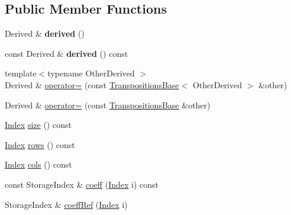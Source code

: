 \subsection*{Public Member Functions}
\begin{DoxyCompactItemize}
\item 
\mbox{\label{class_eigen_1_1_transpositions_base_a108277feb5d561ccd82a92b54d551131}} 
Derived \& {\bfseries derived} ()
\item 
\mbox{\label{class_eigen_1_1_transpositions_base_a170ba41d65a332d9e61f891ec6206ad9}} 
const Derived \& {\bfseries derived} () const
\item 
{\footnotesize template$<$typename Other\+Derived $>$ }\\Derived \& \mbox{\hyperlink{class_eigen_1_1_transpositions_base_a476b5c653c6842e3e4d0104f7f888817}{operator=}} (const \mbox{\hyperlink{class_eigen_1_1_transpositions_base}{Transpositions\+Base}}$<$ Other\+Derived $>$ \&other)
\item 
Derived \& \mbox{\hyperlink{class_eigen_1_1_transpositions_base_a8d12862df7ffdb0f2cfd81ab122847ca}{operator=}} (const \mbox{\hyperlink{class_eigen_1_1_transpositions_base}{Transpositions\+Base}} \&other)
\item 
\mbox{\hyperlink{class_eigen_1_1_transpositions_base_a3f5f06118b419e8e6ccbe49ed5b4c91f}{Index}} \mbox{\hyperlink{class_eigen_1_1_transpositions_base_a6888d6261a9cc24ee8607496e610a5a3}{size}} () const
\item 
\mbox{\hyperlink{class_eigen_1_1_transpositions_base_a3f5f06118b419e8e6ccbe49ed5b4c91f}{Index}} \mbox{\hyperlink{class_eigen_1_1_transpositions_base_a8c073f17542a8fc9ac581c17f6cdc8d3}{rows}} () const
\item 
\mbox{\hyperlink{class_eigen_1_1_transpositions_base_a3f5f06118b419e8e6ccbe49ed5b4c91f}{Index}} \mbox{\hyperlink{class_eigen_1_1_transpositions_base_acb6f58081640839bd4102b75bdeec562}{cols}} () const
\item 
const Storage\+Index \& \mbox{\hyperlink{class_eigen_1_1_transpositions_base_aae1d3847b107e518c9f2b6010a6b635a}{coeff}} (\mbox{\hyperlink{class_eigen_1_1_transpositions_base_a3f5f06118b419e8e6ccbe49ed5b4c91f}{Index}} i) const
\item 
Storage\+Index \& \mbox{\hyperlink{class_eigen_1_1_transpositions_base_a97dda1bb4ff8bdd83d8e97af3e590252}{coeff\+Ref}} (\mbox{\hyperlink{class_eigen_1_1_transpositions_base_a3f5f06118b419e8e6ccbe49ed5b4c91f}{Index}} i)

\end{DoxyCompactItemize}
